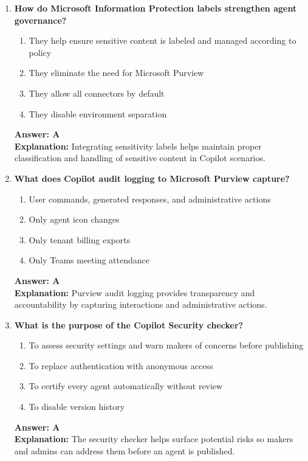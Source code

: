 \documentclass[10pt]{article}
\begin{document}
\begin{enumerate}[leftmargin=*]
\item \textbf{How do Microsoft Information Protection labels strengthen agent governance?}
\begin{enumerate}[label=\Alph*.]
  \item They help ensure sensitive content is labeled and managed according to policy
  \item They eliminate the need for Microsoft Purview
  \item They allow all connectors by default
  \item They disable environment separation
\end{enumerate}
\textbf{Answer: A}\\
\textbf{Explanation:} Integrating sensitivity labels helps maintain proper classification and handling of sensitive content in Copilot scenarios.

\item \textbf{What does Copilot audit logging to Microsoft Purview capture?}
\begin{enumerate}[label=\Alph*.]
  \item User commands, generated responses, and administrative actions
  \item Only agent icon changes
  \item Only tenant billing exports
  \item Only Teams meeting attendance
\end{enumerate}
\textbf{Answer: A}\\
\textbf{Explanation:} Purview audit logging provides transparency and accountability by capturing interactions and administrative actions.

\item \textbf{What is the purpose of the Copilot Security checker?}
\begin{enumerate}[label=\Alph*.]
  \item To assess security settings and warn makers of concerns before publishing
  \item To replace authentication with anonymous access
  \item To certify every agent automatically without review
  \item To disable version history
\end{enumerate}
\textbf{Answer: A}\\
\textbf{Explanation:} The security checker helps surface potential risks so makers and admins can address them before an agent is published.


\end{enumerate}
\end{document}
